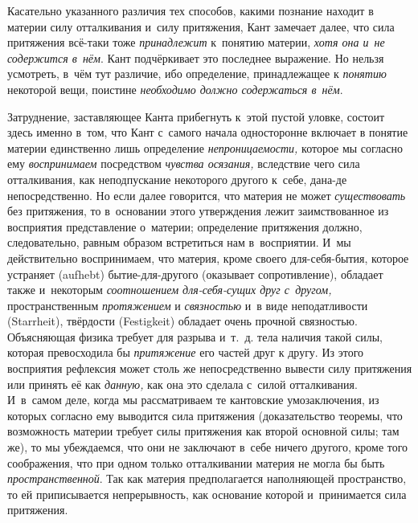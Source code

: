 Касательно указанного различия тех способов, какими познание находит в
материи силу отталкивания и~силу притяжения, Кант замечает далее, что сила
притяжения всё-таки тоже {\em принадлежит} к~понятию
материи, {\em хотя она и~не содержится в~нём}. Кант
подчёркивает это последнее выражение. Но нельзя усмотреть, в~чём тут
различие, ибо определение, принадлежащее к
{\em понятию} некоторой вещи, поистине
{\em необходимо должно содержаться в~нём}.

Затруднение, заставляющее Канта прибегнуть к~этой пустой уловке, состоит
здесь именно в~том, что Кант с~самого начала односторонне включает в
понятие материи единственно лишь определение
{\em непроницаемости,} которое мы согласно ему
{\em воспринимаем} посредством
{\em чувства осязания,} вследствие чего сила
отталкивания, как неподпускание некоторого другого к~себе, дана-де
непосредственно. Но если далее говорится, что материя не может
{\em существовать} без притяжения, то в~основании этого
утверждения лежит заимствованное из восприятия представление о~материи;
определение притяжения должно, следовательно, равным образом встретиться
нам в~восприятии. И~мы действительно воспринимаем, что материя, кроме
своего для-себя-бытия, которое устраняет (aufhebt) бытие-для-другого
(оказывает сопротивление), обладает также и~некоторым
{\em соотношением для-себя-сущих друг с~другом,}
пространственным {\em протяжением} и
{\em связностью} и~в виде неподатливости (Starrheit),
твёрдости (Festigkeit) обладает очень прочной связностью. Объясняющая
физика требует для разрыва и~т.~д. тела наличия такой силы, которая
превосходила бы {\em притяжение} его частей друг к
другу. Из этого восприятия рефлексия может столь же непосредственно вывести
силу притяжения или принять её как {\em данную,} как
она это сделала с~силой отталкивания. И~в~самом деле, когда мы
рассматриваем те кантовские умозаключения, из которых согласно ему
выводится сила притяжения (доказательство теоремы, что возможность материи
требует силы притяжения как второй основной силы; там же), то мы
убеждаемся, что они не заключают в~себе ничего другого, кроме того
соображения, что при одном только отталкивании материя не могла бы быть
{\em пространственной}. Так как материя предполагается
наполняющей пространство, то ей приписывается непрерывность, как основание
которой и~принимается сила притяжения.

